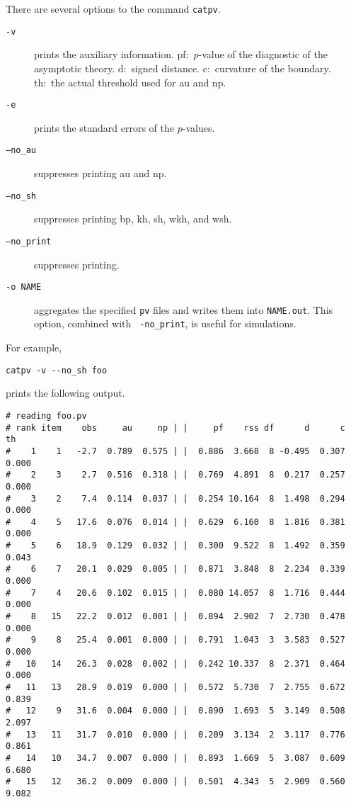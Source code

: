 \documentclass[12pt]{article}
\begin{document}
There are several options to the command {\tt catpv}. 
\begin{description}
 \item[\tt -v] prints the auxiliary information. pf:~$p$-value of the
	    diagnostic of the asymptotic theory. d:~signed
	    distance. c:~curvature of the boundary. th:~the actual
	    threshold used for au and np.
 \item[\tt -e] prints the standard errors of the $p$-values.
 \item[\tt --no{\_}au]  suppresses printing au and np.
 \item[\tt --no{\_}sh]  suppresses printing bp, kh, sh, wkh, and wsh.
 \item[\tt --no{\_}print]  suppresses printing.
 \item[\tt -o NAME] aggregates the specified {\tt pv} files and writes
	    them into {\tt NAME.out}. This option, combined with {\tt
	    -no{\_}print}, is useful for simulations.
\end{description}
For example,
\begin{verbatim}
catpv -v --no_sh foo
\end{verbatim}
prints the following output.
{\small \begin{verbatim}
# reading foo.pv
# rank item    obs     au     np | |     pf    rss df      d      c     th
#    1    1   -2.7  0.789  0.575 | |  0.886  3.668  8 -0.495  0.307  0.000
#    2    3    2.7  0.516  0.318 | |  0.769  4.891  8  0.217  0.257  0.000
#    3    2    7.4  0.114  0.037 | |  0.254 10.164  8  1.498  0.294  0.000
#    4    5   17.6  0.076  0.014 | |  0.629  6.160  8  1.816  0.381  0.000
#    5    6   18.9  0.129  0.032 | |  0.300  9.522  8  1.492  0.359  0.043
#    6    7   20.1  0.029  0.005 | |  0.871  3.848  8  2.234  0.339  0.000
#    7    4   20.6  0.102  0.015 | |  0.080 14.057  8  1.716  0.444  0.000
#    8   15   22.2  0.012  0.001 | |  0.894  2.902  7  2.730  0.478  0.000
#    9    8   25.4  0.001  0.000 | |  0.791  1.043  3  3.583  0.527  0.000
#   10   14   26.3  0.028  0.002 | |  0.242 10.337  8  2.371  0.464  0.000
#   11   13   28.9  0.019  0.000 | |  0.572  5.730  7  2.755  0.672  0.839
#   12    9   31.6  0.004  0.000 | |  0.890  1.693  5  3.149  0.508  2.097
#   13   11   31.7  0.010  0.000 | |  0.209  3.134  2  3.117  0.776  0.861
#   14   10   34.7  0.007  0.000 | |  0.893  1.669  5  3.087  0.609  6.680
#   15   12   36.2  0.009  0.000 | |  0.501  4.343  5  2.909  0.560  9.082
\end{verbatim}}
\end{document}
